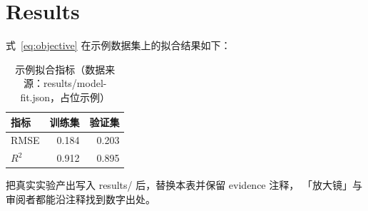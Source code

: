 \section{Results}

式~\eqref{eq:objective} 在示例数据集上的拟合结果如下：

\begin{table}[h]
  \centering
  \caption{示例拟合指标（数据来源：results/model-fit.json，占位示例）}
  \begin{tabular}{lrr}
    \hline
    指标 & 训练集 & 验证集 \\
    \hline
    RMSE & 0.184 & 0.203 \\
    $R^2$ & 0.912 & 0.895 \\
    \hline
  \end{tabular}
\end{table}

把真实实验产出写入 results/ 后，替换本表并保留 evidence 注释，
「放大镜」与审阅者都能沿注释找到数字出处。
